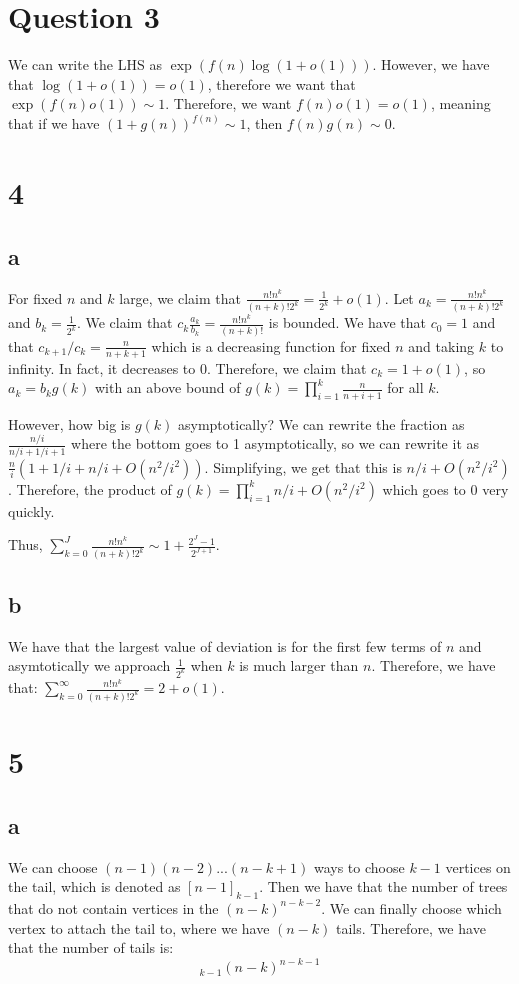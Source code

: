 \documentclass[]{article}
\begin{document}
\section{Question 3}
We can write the LHS as $\exp(f(n) \log(1 + o(1)))$. However, we have that $\log(1 + o(1)) = o(1)$, therefore we want that $\exp(f(n) o(1)) \sim 1$. Therefore, we want $f(n) o(1) = o(1)$, meaning that if we have $(1 + g(n))^{f(n)} \sim 1$, then $f(n)g(n) \sim 0$.  

\section{4}
\subsection{a}
For fixed $n$ and $k$ large, we claim that $\frac{n! n^k}{(n + k)! 2^k} = \frac{1}{2^k}  + o(1)$. Let $a_k = \frac{n! n^k}{(n + k)! 2^k}$ and $b_k = \frac{1}{2^k}$. We claim that $c_k \frac{a_k}{b_k} = \frac{n! n^k}{(n + k)!}$ is bounded. We have that $c_0 = 1$ and that $c_{k + 1}/c_k = \frac{n}{n + k + 1}$ which is a decreasing function for fixed $n$ and taking $k$ to infinity. In fact, it decreases to 0. Therefore, we claim that $c_k = 1 + o(1)$, so $a_k = b_k g(k)$ with an above bound of $g(k) = \prod_{i = 1}^k \frac{n}{n + i + 1}$ for all $k$.

However, how big is $g(k)$ asymptotically? We can rewrite the fraction as $\frac{n/i}{n/i + 1/i + 1}$ where the bottom goes to 1 asymptotically, so we can rewrite it as $\frac{n}{i}(1 + 1/i + n/i + O(n^2/i^2))$. Simplifying, we get that this is $n/i + O(n^2/i^2)$. Therefore, the product of $g(k) =  \prod_{i = 1}^k n/i + O(n^2/i^2)$ which goes to 0 very quickly. 

 Thus, $ \sum_{k = 0}^{J} \frac{n! n^k}{(n + k)! 2^k}  \sim 1 + \frac{2^{J} - 1}{2^{J + 1}}$. 
 
 \subsection{b}
 We have that the largest value of deviation is for the first few terms of $n$ and asymtotically we approach $\frac{1}{2^k}$ when $k$ is much larger than $n$. Therefore, we have that:
 $ \sum_{k = 0}^{\infty} \frac{n! n^k}{(n + k)! 2^k}  = 2 + o(1)$. 
\section{5}
\subsection{a}
We can choose $(n - 1)(n - 2) ... (n-k + 1)$ ways to choose $k - 1$ vertices on the tail, which is denoted as $[n - 1]_{k - 1}$. Then we have that the number of trees that do not contain vertices in the  $(n - k)^{n - k - 2}$. We can finally choose which vertex to attach the tail to, where we have $(n - k)$ tails. Therefore, we have that the number of tails is:
\begin{equation}
	[n - 1]_{k - 1} (n - k)^{n - k - 1}
\end{equation}
\end{document}
